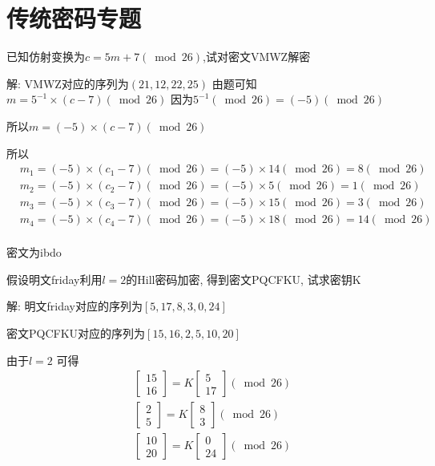 \documentclass[UTF8]{ctexart}
\begin{document}
\section{传统密码专题}
\begin{enumerate}[label={[}\arabic*{]}]
  \item 已知仿射变换为$c=5m+7(\bmod 26)$,试对密文VMWZ解密

  解: VMWZ对应的序列为$(21, 12, 22, 25)$
  由题可知$m=5^{-1}\times (c-7)(\bmod 26)$
  因为$5^{-1}(\bmod 26)=(-5)(\bmod 26)$

  所以$m=(-5)\times (c-7)(\bmod 26)$

  所以
  $$
  \begin{aligned}
    &m_1=(-5)\times (c_1-7)(\bmod 26)=(-5)\times 14(\bmod 26)=8(\bmod 26)\\
    &m_2=(-5)\times (c_2-7)(\bmod 26)=(-5)\times 5(\bmod 26)=1(\bmod 26)\\
    &m_3=(-5)\times (c_3-7)(\bmod 26)=(-5)\times 15(\bmod 26)=3(\bmod 26)\\
    &m_4=(-5)\times (c_4-7)(\bmod 26)=(-5)\times 18(\bmod 26)=14(\bmod 26)\\
  \end{aligned}
  $$

  密文为ibdo

  \item 假设明文friday利用$l=2$的Hill密码加密, 得到密文PQCFKU, 试求密钥K

  解: 明文friday对应的序列为$[5,17,8,3,0,24]$

  密文PQCFKU对应的序列为$[15,16,2,5,10,20]$

  由于$l=2$
  可得
  $$
  \begin{aligned}
    &\left[ \begin{array}{c}{15}\\ {16} \end{array}\right]=K\left[ \begin{array}{c}{5}\\ {17} \end{array}\right](\bmod 26)\\
    &\left[ \begin{array}{c}{2}\\ {5} \end{array}\right]=K\left[ \begin{array}{c}{8}\\ {3} \end{array}\right](\bmod 26)\\
    &\left[ \begin{array}{c}{10}\\ {20} \end{array}\right]=K\left[ \begin{array}{c}{0}\\ {24} \end{array}\right](\bmod 26)\\
  \end{aligned}
  $$


\end{enumerate}
\end{document}
